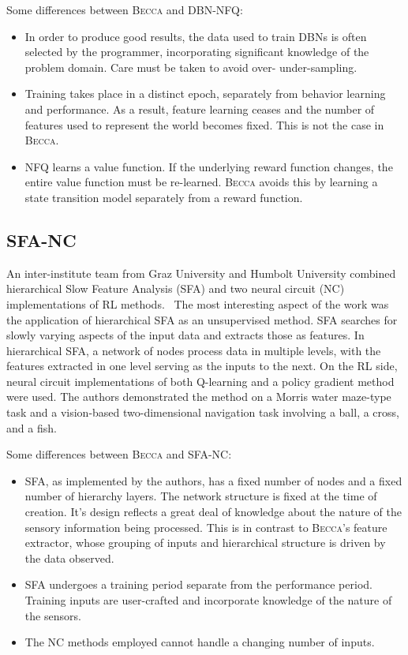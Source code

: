 Some differences between \textsc{Becca} and DBN-NFQ:

\begin{itemize}
\item In order to produce good results, the data used to train DBNs is often selected by the programmer, incorporating significant knowledge of the problem domain. Care must be taken to avoid over- under-sampling.
\item Training takes place in a distinct epoch, separately from behavior learning and performance. As a result, feature learning ceases and the number of features used to represent the world becomes fixed. This is not the case in \textsc{Becca}.
\item NFQ learns a value function. If the underlying reward function changes, the entire value function must be re-learned. \textsc{Becca} avoids this by learning a state transition model separately from a reward function.
\end{itemize}

\subsection{SFA-NC} 
An inter-institute team from Graz University and Humbolt University combined hierarchical Slow Feature Analysis (SFA) and two neural circuit (NC) implementations of RL methods.~\cite{legenstein10} The most interesting aspect of the work was the application of hierarchical SFA as an unsupervised method. SFA searches for slowly varying aspects of the input data and extracts those as features. In hierarchical SFA, a network of nodes process data in multiple levels, with the features extracted in one level serving as the inputs to the next. On the RL side, neural circuit implementations of both Q-learning and a policy gradient method were used. The authors demonstrated the method on a Morris water maze-type task and a vision-based two-dimensional navigation task involving a ball, a cross, and a fish.

Some differences between \textsc{Becca} and SFA-NC:

\begin{itemize}
\item SFA, as implemented by the authors, has a fixed number of nodes and a fixed number of hierarchy layers. The network structure is fixed at the time of creation. It's design reflects a great deal of knowledge about the nature of the sensory information being processed. This is in contrast to \textsc{Becca}'s feature extractor, whose grouping of inputs and hierarchical structure is driven by the data observed.
\item SFA undergoes a training period separate from the performance period. Training inputs are user-crafted and incorporate knowledge of the nature of the sensors.
\item The NC methods employed cannot handle a changing number of inputs.
\end{itemize}

